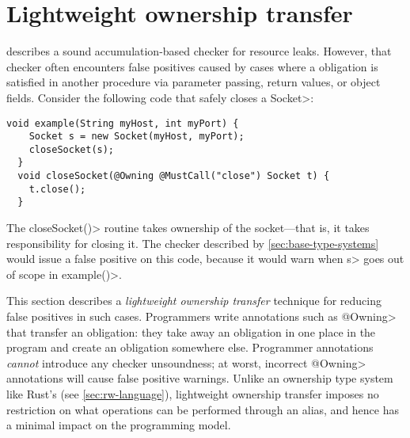 \section{Lightweight ownership transfer}
\label{sec:lightweight-ownership}



 describes a sound accumulation-based
checker for resource leaks. However, that checker often encounters false
positives caused by cases where a \MustCall obligation is satisfied
in another procedure via parameter passing, return values, or object fields.
Consider the following code that safely closes a \<Socket>:

\begin{lstlisting}[frame=tb,belowskip=3mm]
  void example(String myHost, int myPort) {
    Socket s = new Socket(myHost, myPort);
    closeSocket(s);
  }
  void closeSocket(@Owning @MustCall("close") Socket t) {
    t.close();
  }  
\end{lstlisting}

The \<closeSocket()> routine takes ownership of the socket---that is,
it takes responsibility for closing it. The checker described by
\cref{sec:base-type-systems} would issue a false positive on this
code, because it would warn when \<s>
goes out of scope in \<example()>.

This section describes a \emph{lightweight ownership transfer} technique for reducing
false positives in such cases.
Programmers write annotations such as \<@Owning> that transfer an
obligation:  they take away an obligation
in one place in the program and create an obligation somewhere else.
Programmer
annotations \emph{cannot} introduce any checker unsoundness; at worst,
incorrect \<@Owning> annotations will cause false positive warnings.
Unlike an ownership type system like Rust's (see \cref{sec:rw-language}),
lightweight ownership transfer imposes no restriction on what operations can be performed
through an alias, and hence has a minimal impact on the programming model.


